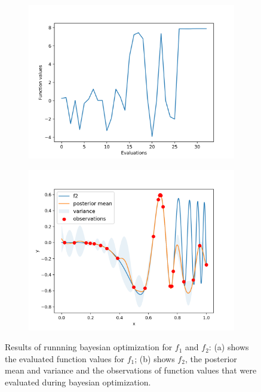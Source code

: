 \documentclass[11pt]{article}
\begin{document}
\begin{figure}[H]
	\centering
	\begin{subfigure}[b]{.35\textwidth}
		\centering
		\includegraphics[width=\textwidth]{assets/3-f1}
		\caption{}
	\end{subfigure}
	\begin{subfigure}[b]{.35\textwidth}
		\centering
		\includegraphics[width=\textwidth]{assets/3-f2}
		\caption{}
	\end{subfigure}

	\caption{Results of runnning bayesian optimization for $f_1$ and $f_2$: (a) shows the evaluated function values for $f_1$; (b) shows $f_2$, the posterior mean and variance and the observations of function values that were evaluated during bayesian optimization.}
	\label{fig:3-f1-f2}
\end{figure}




\end{document}
